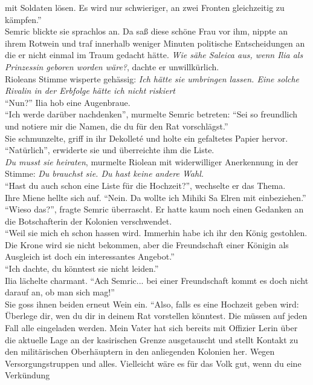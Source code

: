 mit Soldaten lösen. Es wird nur schwieriger, an zwei Fronten gleichzeitig zu kämpfen.''\\
Semric blickte sie sprachlos an. Da saß diese schöne Frau vor ihm, nippte an ihrem Rotwein 
und traf innerhalb weniger Minuten politische Entscheidungen an die er nicht einmal im Traum 
gedacht hätte. \textit{Wie sähe Saleica aus, wenn Ilia als Prinzessin geboren worden wäre?}, dachte 
er unwillkürlich.\\
Rioleans Stimme wisperte gehässig: \textit{Ich hätte sie umbringen lassen. Eine solche Rivalin in 
der Erbfolge hätte ich nicht riskiert}\\
``Nun?'' Ilia hob eine Augenbraue.\\
``Ich werde darüber nachdenken'', murmelte Semric betreten: ``Sei so freundlich und notiere mir die 
Namen, die du für den Rat vorschlägst.''\\
Sie schmunzelte, griff in ihr Dekolleté und holte ein gefaltetes Papier hervor. ``Natürlich'', 
erwiderte sie und überreichte ihm die Liste.\\
\textit{Du musst sie heiraten}, murmelte Riolean mit widerwilliger Anerkennung in der Stimme: 
\textit{Du brauchst sie. Du hast keine andere Wahl.}\\
``Hast du auch schon eine Liste für die Hochzeit?'', wechselte er das Thema.\\
Ihre Miene hellte sich auf. ``Nein. Da wollte ich Mihiki Sa Elren mit einbeziehen.''\\
``Wieso das?'', fragte Semric überrascht. Er hatte kaum noch einen Gedanken an die Botschafterin 
der Kolonien verschwendet.\\
``Weil sie mich eh schon hassen wird. Immerhin habe ich ihr den König gestohlen. Die Krone wird sie 
nicht bekommen, aber die Freundschaft einer Königin als Ausgleich ist doch ein interessantes 
Angebot.''\\
``Ich dachte, du könntest sie nicht leiden.''\\
Ilia lächelte charmant. ``Ach Semric... bei einer Freundschaft kommt es doch nicht darauf an, ob 
man sich mag!''\\
Sie goss ihnen beiden erneut Wein ein. ``Also, falls es eine Hochzeit geben wird: Überlege dir, wen 
du dir in deinem Rat vorstellen könntest. Die müssen auf jeden Fall alle eingeladen werden. Mein 
Vater hat sich bereits mit Offizier Lerin über die aktuelle Lage an der kasirischen Grenze 
ausgetauscht und stellt Kontakt zu den militärischen Oberhäuptern in den anliegenden Kolonien her. 
Wegen Versorgungstruppen und alles. Vielleicht wäre es für das Volk gut, wenn du eine Verkündung 
